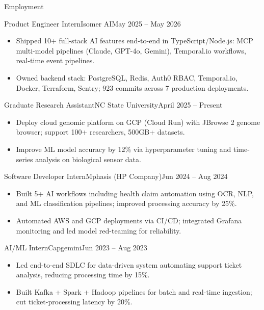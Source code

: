 \documentclass[]{mcdowellcv}
\begin{document}
\makeheader

\begin{cvsection}{Employment}
  \begin{cvsubsection}{Product Engineer Intern}{Isomer AI}{May 2025 -- May 2026}
    \begin{itemize}
      \item Shipped 10+ full-stack AI features end-to-end in TypeScript/Node.js: MCP multi-model pipelines (Claude, GPT-4o, Gemini), Temporal.io workflows, real-time event pipelines.
      \item Owned backend stack: PostgreSQL, Redis, Auth0 RBAC, Temporal.io, Docker, Terraform, Sentry; 923 commits across 7 production deployments.
    \end{itemize}
    \vspace{-1.5pt}
  \end{cvsubsection}

  \begin{cvsubsection}{Graduate Research Assistant}{NC State University}{April 2025 -- Present}
    \begin{itemize}
      \item Deploy cloud genomic platform on GCP (Cloud Run) with JBrowse 2 genome browser; support 100+ researchers, 500GB+ datasets.
      \item Improve ML model accuracy by 12\% via hyperparameter tuning and time-series analysis on biological sensor data.
    \end{itemize}
    \vspace{-1.5pt}
  \end{cvsubsection}

  \begin{cvsubsection}{Software Developer Intern}{Mphasis (HP Company)}{Jun 2024 -- Aug 2024}
    \begin{itemize}
      \item Built 5+ AI workflows including health claim automation using OCR, NLP, and ML classification pipelines; improved processing accuracy by 25\%.
      \item Automated AWS and GCP deployments via CI/CD; integrated Grafana monitoring and led model red-teaming for reliability.
    \end{itemize}
    \vspace{-1.5pt}
  \end{cvsubsection}

  \begin{cvsubsection}{AI/ML Intern}{Capgemini}{Jun 2023 -- Aug 2023}
    \begin{itemize}
      \item Led end-to-end SDLC for data-driven system automating support ticket analysis, reducing processing time by 15\%.
      \item Built Kafka + Spark + Hadoop pipelines for batch and real-time ingestion; cut ticket-processing latency by 20\%.
    \end{itemize}
    \vspace{-1.5pt}
  \end{cvsubsection}
\end{cvsection}
\end{document}
